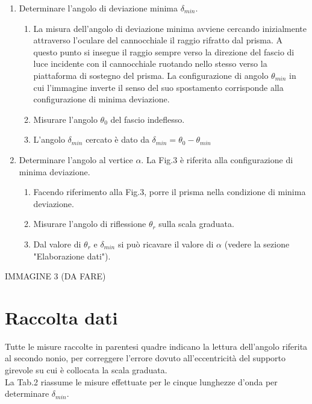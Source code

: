\documentclass{article}
\begin{document}
\begin{enumerate}
\item Determinare l'angolo di deviazione minima $\delta_{min}$. 
  \begin{enumerate}
  \item La misura dell’angolo di deviazione minima avviene cercando inizialmente attraverso l’oculare del  cannocchiale il raggio rifratto dal prisma. A questo punto si insegue il raggio sempre verso la direzione del fascio di luce incidente con il cannocchiale ruotando nello stesso verso la piattaforma di sostegno del prisma. La  configurazione di angolo $\theta_{min}$ in cui l’immagine inverte il senso del suo spostamento corrisponde alla configurazione di minima deviazione.
  \item Misurare l'angolo $\theta_0$ del fascio indeflesso.
  \item L'angolo $\delta_{min}$ cercato è dato da $\delta_{min} = \theta_0 - \theta_{min}$
  \end{enumerate}
\item Determinare l'angolo al vertice $\alpha$. La Fig.3 è riferita alla configurazione di minima deviazione.
  \begin{enumerate}
  \item Facendo riferimento alla Fig.3, porre il prisma nella condizione di minima deviazione.
  \item Misurare l'angolo di riflessione $\theta_r$ sulla scala graduata.
  \item Dal valore di $\theta_r$ e $\delta_{min}$ si può ricavare il valore di $\alpha$ (vedere la sezione "Elaborazione dati").
  \end{enumerate}              
\end{enumerate}

IMMAGINE 3 (DA FARE)

\newpage
\section{Raccolta dati}
Tutte le misure raccolte in parentesi quadre indicano la lettura dell'angolo riferita al secondo nonio, per correggere l'errore dovuto all'eccentricità del supporto girevole su cui è collocata la scala graduata. \\
La Tab.2 riassume le misure effettuate per le cinque lunghezze d'onda per determinare $\delta_{min}$.
\end{document}
